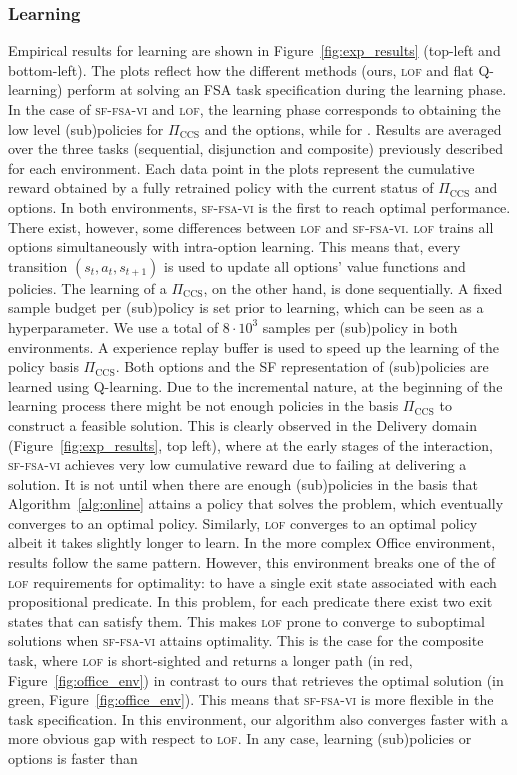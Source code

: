 \subsubsection{Learning} Empirical results for learning are shown in Figure~\ref{fig:exp_results} (top-left and bottom-left). The plots reflect how the different methods (ours, \textsc{lof} and flat Q-learning) perform at solving an FSA task specification during the learning phase. In the case of \textsc{sf-fsa-vi} and \textsc{lof}, the learning phase corresponds to obtaining the low level (sub)policies for $\Pi_\text{CCS}$ and the options, while for . Results are averaged over the three tasks (sequential, disjunction and composite) previously described for each environment. Each data point in the plots represent the cumulative reward obtained by a fully retrained policy with the current status of $\Pi_\text{CCS}$ and options. In both environments, \textsc{sf-fsa-vi} is the first to reach optimal performance. There exist, however, some differences between \textsc{lof} and \textsc{sf-fsa-vi}. \textsc{lof} trains all options simultaneously with intra-option learning. This means that, every transition $(s_t, a_t, s_{t+1})$ is used to update all options' value functions and policies. The learning of a $\Pi_\text{CCS}$, on the other hand, is done sequentially. A fixed sample budget per (sub)policy is set prior to learning, which can be seen as a hyperparameter. We use a total of $8\cdot 10^3$ samples per (sub)policy in both environments. A experience replay buffer is used to speed up the learning of the policy basis $\Pi_\text{CCS}$. Both options and the SF representation of (sub)policies are learned using Q-learning. Due to the incremental nature, at the beginning of the learning process there might be not enough policies in the basis $\Pi_\text{CCS}$ to construct a feasible solution. This is clearly observed in the Delivery domain (Figure~\ref{fig:exp_results}, top left), where at the early stages of the interaction, \textsc{sf-fsa-vi} achieves very low cumulative reward due to failing at delivering a solution. It is not until when there are enough (sub)policies in the basis that Algorithm~\ref{alg:online} attains a policy that solves the problem, which eventually converges to an optimal policy. Similarly, \textsc{lof} converges to an optimal policy albeit it takes slightly longer to learn. In the more complex Office environment, results follow the same pattern. However, this environment breaks one of the of \textsc{lof} requirements for optimality: to have a single exit state associated with each propositional predicate. In this problem, for each predicate there exist two exit states that can satisfy them. This makes \textsc{lof} prone to converge to suboptimal solutions when \textsc{sf-fsa-vi} attains optimality. This is the case for the composite task, where \textsc{lof} is short-sighted and returns a longer path (in red, Figure~\ref{fig:office_env}) in contrast to ours that retrieves the optimal solution (in green, Figure~\ref{fig:office_env}). This means that \textsc{sf-fsa-vi} is more flexible in the task specification. In this environment, our algorithm also converges faster with a more obvious gap with respect to \textsc{lof}. In any case, learning (sub)policies or options is faster than 